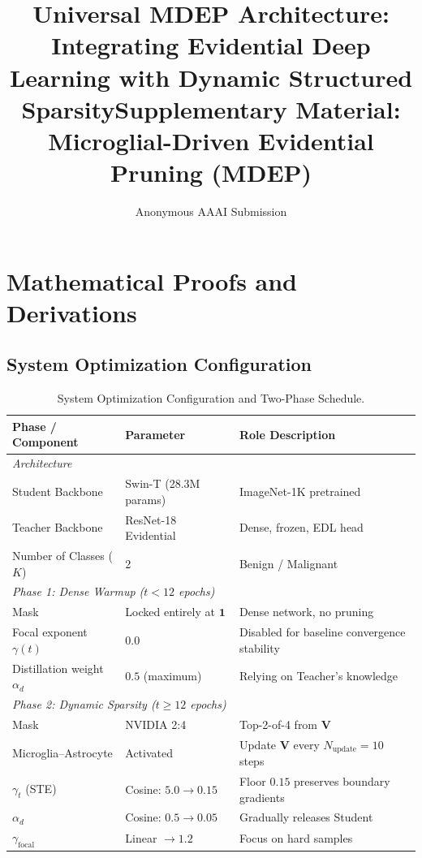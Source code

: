 \documentclass[letterpaper]{article} %
\title{Universal MDEP Architecture: Integrating Evidential Deep Learning with Dynamic Structured Sparsity}
\author{Anonymous AAAI Submission}
\begin{document}
\title{Supplementary Material: Microglial-Driven Evidential Pruning (MDEP)}
\maketitle
\appendix
\section{Mathematical Proofs and Derivations}

\subsection{System Optimization Configuration}
\begin{table}[H]
\centering
\caption{System Optimization Configuration and Two-Phase Schedule.}
\label{tab:config}
\begin{tabular}{@{}lll@{}}
\toprule
\textbf{Phase / Component} & \textbf{Parameter} & \textbf{Role Description} \\
\midrule
\multicolumn{3}{l}{\emph{Architecture}} \\
Student Backbone & Swin-T (28.3M params) & ImageNet-1K pretrained \\
Teacher Backbone & ResNet-18 Evidential & Dense, frozen, EDL head \\
Number of Classes ($K$) & 2 & Benign / Malignant \\
\midrule
\multicolumn{3}{l}{\emph{Phase 1: Dense Warmup ($t < 12$ epochs)}} \\
Mask & Locked entirely at $\bm{1}$ & Dense network, no pruning \\
Focal exponent $\gamma(t)$ & $0.0$ & Disabled for baseline convergence stability \\
Distillation weight $\alpha_d$ & $0.5$ (maximum) & Relying on Teacher's knowledge \\
\midrule
\multicolumn{3}{l}{\emph{Phase 2: Dynamic Sparsity ($t \ge 12$ epochs)}} \\
Mask & NVIDIA 2:4 & Top-2-of-4 from $\bm{V}$ \\
Microglia--Astrocyte & Activated & Update $\bm{V}$ every $N_{\text{update}} = 10$ steps \\
$\gamma_t$ (STE) & Cosine: $5.0 \to 0.15$ & Floor $0.15$ preserves boundary gradients \\
$\alpha_d$ & Cosine: $0.5 \to 0.05$ & Gradually releases Student \\
$\gamma_{\text{focal}}$ & Linear $\to 1.2$ & Focus on hard samples \\

\end{tabular}
\end{table}
\end{document}
